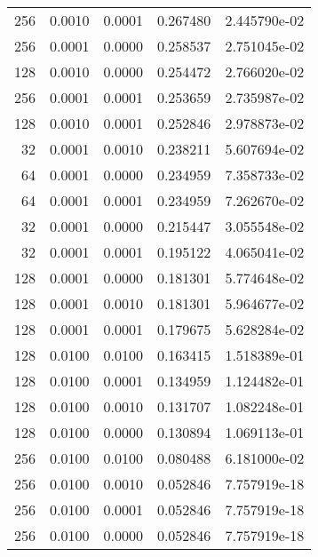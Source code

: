 \begin{tabular}{rrrrr}
 256 &  0.0010 &  0.0001 &  0.267480 &  2.445790e-02 \\
 256 &  0.0001 &  0.0000 &  0.258537 &  2.751045e-02 \\
 128 &  0.0010 &  0.0000 &  0.254472 &  2.766020e-02 \\
 256 &  0.0001 &  0.0001 &  0.253659 &  2.735987e-02 \\
 128 &  0.0010 &  0.0001 &  0.252846 &  2.978873e-02 \\
  32 &  0.0001 &  0.0010 &  0.238211 &  5.607694e-02 \\
  64 &  0.0001 &  0.0000 &  0.234959 &  7.358733e-02 \\
  64 &  0.0001 &  0.0001 &  0.234959 &  7.262670e-02 \\
  32 &  0.0001 &  0.0000 &  0.215447 &  3.055548e-02 \\
  32 &  0.0001 &  0.0001 &  0.195122 &  4.065041e-02 \\
 128 &  0.0001 &  0.0000 &  0.181301 &  5.774648e-02 \\
 128 &  0.0001 &  0.0010 &  0.181301 &  5.964677e-02 \\
 128 &  0.0001 &  0.0001 &  0.179675 &  5.628284e-02 \\
 128 &  0.0100 &  0.0100 &  0.163415 &  1.518389e-01 \\
 128 &  0.0100 &  0.0001 &  0.134959 &  1.124482e-01 \\
 128 &  0.0100 &  0.0010 &  0.131707 &  1.082248e-01 \\
 128 &  0.0100 &  0.0000 &  0.130894 &  1.069113e-01 \\
 256 &  0.0100 &  0.0100 &  0.080488 &  6.181000e-02 \\
 256 &  0.0100 &  0.0010 &  0.052846 &  7.757919e-18 \\
 256 &  0.0100 &  0.0001 &  0.052846 &  7.757919e-18 \\
 256 &  0.0100 &  0.0000 &  0.052846 &  7.757919e-18 \\
\bottomrule
\end{tabular}
